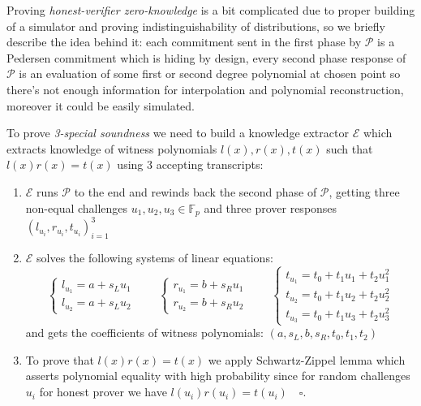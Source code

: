 \documentclass[../lecture-notes-148x210.tex]{subfiles}
\begin{document}
Proving \textit{honest-verifier zero-knowledge} is a bit complicated due to proper building of a simulator and proving indistinguishability of distributions, so we briefly describe the idea behind it: each commitment sent in the first phase by $\mathcal{P}$ is a Pedersen commitment which is hiding by design, every second phase response of $\mathcal{P}$ is an evaluation of some first or second degree polynomial at chosen point so there's not enough information for interpolation and polynomial reconstruction, moreover it could be easily simulated.

To prove \textit{3-special soundness} we need to build a knowledge extractor $\mathcal{E}$ which extracts knowledge of witness polynomials $l(x), r(x), t(x)$ such that $l(x)r(x) = t(x)$ using 3 accepting transcripts: 
\begin{enumerate}
    \item $\mathcal{E}$ runs $\mathcal{P}$ to the end and rewinds back the second phase of $\mathcal{P}$, getting three non-equal challenges $u_1, u_2, u_3 \in \mathbb{F}_p$ and three prover responses $(l_{u_i}, r_{u_i}, t_{u_i})_{i=1}^3$
    \item $\mathcal{E}$ solves the following systems of linear equations:
    \begin{equation*}
        \begin{cases}
            l_{u_1} = a + s_L u_1 \\
            l_{u_2} = a + s_L u_2
        \end{cases}
        \qquad
        \begin{cases}
            r_{u_1} = b + s_R u_1 \\
            r_{u_2} = b + s_R u_2
        \end{cases}
        \qquad
        \begin{cases}
            t_{u_1} = t_0 + t_1 u_1 + t_2 u_1^2 \\
            t_{u_2} = t_0 + t_1 u_2 + t_2 u_2^2 \\
            t_{u_3} = t_0 + t_1 u_3 + t_2 u_3^2
        \end{cases}
    \end{equation*}
    and gets the coefficients of witness polynomials: $(a, s_L, b, s_R, t_0, t_1, t_2)$
    \item To prove that $l(x)r(x) = t(x)$ we apply Schwartz-Zippel lemma which asserts polynomial equality with high probability since for random challenges $u_i$ for honest prover we have $l(u_i)r(u_i) = t(u_i) \quad \square$.
\end{enumerate}
\end{document}
